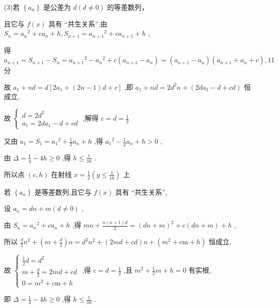 \documentclass[10pt]{article}
\begin{document}
(3)若 \(\left\{  {a}_{n}\right\}\) 是公差为 \(d\left( {d \neq  0}\right)\) 的等差数列，

且它与 \(f\left( x\right)\) 具有 “共生关系”,由 \({S}_{n} = {a}_{n}{}^{2} + c{a}_{n} + h,{S}_{n + 1} = {a}_{n + 1}{}^{2} + c{a}_{n + 1} + h\) ,

得 \({a}_{n + 1} = {S}_{n + 1} - {S}_{n} = {a}_{n + 1}{}^{2} - {a}_{n}{}^{2} + c\left( {{a}_{n + 1} - {a}_{n}}\right)  = \left( {{a}_{n + 1} - {a}_{n}}\right) \left( {{a}_{n + 1} + {a}_{n} + c}\right) ,{11}\) 分

故 \({a}_{1} + {nd} = d\left\lbrack  {2{a}_{1} + \left( {{2n} - 1}\right) d + c}\right\rbrack\) ,即 \({a}_{1} + {nd} = 2{d}^{2}n + \left( {{2d}{a}_{1} - d + {cd}}\right)\) 恒成立,

故 \(\left\{  \begin{matrix} d = 2{d}^{2} \\  {a}_{1} = {2d}{a}_{1} - d + {cd} \end{matrix}\right.\) ,解得 \(c = d = \frac{1}{2}\)

又由 \({a}_{1} = {S}_{1} = {a}_{1}{}^{2} + \frac{1}{2}{a}_{n} + h\) ,得 \({a}_{1}{}^{2} - \frac{1}{2}{a}_{n} + h > 0\) ,

由 \(\Delta  = \frac{1}{4} - {4h} \geq  0\) ,得 \(h \leq  \frac{1}{16}\) .

所以点 \(\left( {c,h}\right)\) 在射线 \(x = \frac{1}{2}\left( {y \leq  \frac{1}{16}}\right)\) 上

若 \(\left\{  {a}_{n}\right\}\) 是等差数列,且它与 \(f\left( x\right)\) 具有 “共生关系”,

设 \({a}_{n} = {dn} + m\left( {d \neq  0}\right)\) ,

由 \({S}_{n} = {a}_{n}{}^{2} + c{a}_{n} + h\) ,得 \({mn} + \frac{n\left( {n + 1}\right) d}{2} = {\left( dn + m\right) }^{2} + c\left( {{dn} + m}\right)  + h\) ,

所以 \(\frac{d}{2}{n}^{2} + \left( {m + \frac{d}{2}}\right) n = {d}^{2}{n}^{2} + \left( {{2md} + {cd}}\right) n + \left( {{m}^{2} + \mathrm{{cm}} + h}\right)\) 恒成立,

故 \(\left\{  \begin{matrix} \frac{1}{2}d = {d}^{2} \\  m + \frac{d}{2} = {2md} + {cd} \\  0 = {m}^{2} + \mathrm{{cm}} + h \end{matrix}\right.\) ,得 \(c = d = \frac{1}{2}\) ,且 \({m}^{2} + \frac{1}{2}m + h = 0\) 有实根,

即 \(\Delta  = \frac{1}{4} - {4h} \geq  0\) ,得 \(h \leq  \frac{1}{16}\) .
\end{document}
